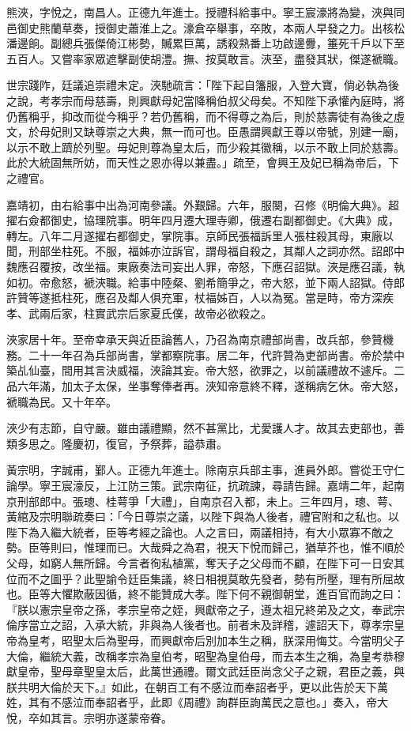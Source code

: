 \begin{pinyinscope}
熊浹，字悅之，南昌人。正德九年進士。授禮科給事中。寧王宸濠將為變，浹與同邑御史熊蘭草奏，授御史蕭淮上之。濠倉卒舉事，卒敗，本兩人早發之力。出核松潘邊餉。副總兵張傑倚江彬勢，贓累巨萬，誘殺熟番上功啟邊釁，箠死千戶以下至五百人。又嘗率家眾遮擊副使胡澧。撫、按莫敢言。浹至，盡發其狀，傑遂褫職。

世宗踐阼，廷議追崇禮未定。浹馳疏言：「陛下起自籓服，入登大寶，倘必執為後之說，考孝宗而母慈壽，則興獻母妃當降稱伯叔父母矣。不知陛下承懽內庭時，將仍舊稱乎，抑改而從今稱乎？若仍舊稱，而不得尊之為后，則於慈壽徒有為後之虛文，於母妃則又缺尊崇之大典，無一而可也。臣愚謂興獻王尊以帝號，別建一廟，以示不敢上躋於列聖。母妃則尊為皇太后，而少殺其徽稱，以示不敢上同於慈壽。此於大統固無所妨，而天性之恩亦得以兼盡。」疏至，會興王及妃已稱為帝后，下之禮官。

嘉靖初，由右給事中出為河南參議。外艱歸。六年，服闋，召修《明倫大典》。超擢右僉都御史，協理院事。明年四月遷大理寺卿，俄遷右副都御史。《大典》成，轉左。八年二月遂擢右都御史，掌院事。京師民張福訴里人張柱殺其母，東廠以聞，刑部坐柱死。不服，福姊亦泣訴官，謂母福自殺之，其鄰人之詞亦然。詔郎中魏應召覆按，改坐福。東廠奏法司妄出人罪，帝怒，下應召詔獄。浹是應召議，執如初。帝愈怒，褫浹職。給事中陸粲、劉希簡爭之，帝大怒，並下兩人詔獄。侍郎許贊等遂抵柱死，應召及鄰人俱充軍，杖福姊百，人以為冤。當是時，帝方深疾孝、武兩后家，柱實武宗后家夏氏僕，故帝必欲殺之。

浹家居十年。至帝幸承天與近臣論舊人，乃召為南京禮部尚書，改兵部，參贊機務。二十一年召為兵部尚書，掌都察院事。居二年，代許贊為吏部尚書。帝於禁中築乩仙臺，間用其言決威福，浹論其妄。帝大怒，欲罪之，以前議禮故不遽斥。二品六年滿，加太子太保，坐事奪俸者再。浹知帝意終不釋，遂稱病乞休。帝大怒，褫職為民。又十年卒。

浹少有志節，自守嚴。雖由議禮顯，然不甚黨比，尤愛護人才。故其去吏部也，善類多思之。隆慶初，復官，予祭葬，謚恭肅。

黃宗明，字誠甫，鄞人。正德九年進士。除南京兵部主事，進員外郎。嘗從王守仁論學。寧王宸濠反，上江防三策。武宗南征，抗疏諫，尋請告歸。嘉靖二年，起南京刑部郎中。張璁、桂萼爭「大禮」，自南京召入都，未上。三年四月，璁、萼、黃綰及宗明聯疏奏曰：「今日尊崇之議，以陛下與為人後者，禮官附和之私也。以陛下為入繼大統者，臣等考經之論也。人之言曰，兩議相持，有大小眾寡不敵之勢。臣等則曰，惟理而已。大哉舜之為君，視天下悅而歸己，猶草芥也，惟不順於父母，如窮人無所歸。今言者徇私植黨，奪天子之父母而不顧，在陛下可一日安其位而不之圖乎？此聖諭令廷臣集議，終日相視莫敢先發者，勢有所壓，理有所屈故也。臣等大懼欺蔽因循，終不能贊成大孝。陛下何不親御朝堂，進百官而詢之曰：『朕以憲宗皇帝之孫，孝宗皇帝之姪，興獻帝之子，遵太祖兄終弟及之文，奉武宗倫序當立之詔，入承大統，非與為人後者也。前者未及詳稽，遽詔天下，尊孝宗皇帝為皇考，昭聖太后為聖母，而興獻帝后別加本生之稱，朕深用悔艾。今當明父子大倫，繼統大義，改稱孝宗為皇伯考，昭聖為皇伯母，而去本生之稱，為皇考恭穆獻皇帝，聖母章聖皇太后，此萬世通禮。爾文武廷臣尚念父子之親，君臣之義，與朕共明大倫於天下。』如此，在朝百工有不感泣而奉詔者乎，更以此告於天下萬姓，其有不感泣而奉詔者乎，此即《周禮》詢群臣詢萬民之意也。」奏入，帝大悅，卒如其言。宗明亦遂蒙帝眷。


\end{pinyinscope}
